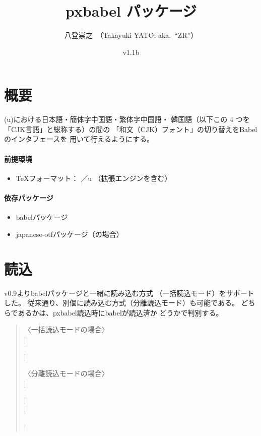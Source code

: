 \documentclass[a4paper,uplatex]{jsarticle}
\newcommand{\PkgVersion}{1.1b}
\newcommand{\PkgDate}{2017/07/03}
\newcommand{\Pkg}[1]{\textsf{#1}}
\newcommand{\Meta}[1]{$\langle$\mbox{}#1\mbox{}$\rangle$}
\providecommand{\upLaTeX}{u\pLaTeX}
\begin{document}
\title{\Pkg{pxbabel} パッケージ}
\author{八登崇之\ （Takayuki YATO; aka.~``ZR''）}
\date{v\PkgVersion \quad [\PkgDate]}
\maketitle

\section{概要}

{(u)\pLaTeX}における日本語・簡体字中国語・繁体字中国語・
韓国語（以下この 4 つを「CJK言語」と総称する）の間の
「和文（CJK）フォント」の切り替えをBabelのインタフェースを
用いて行えるようにする。

\paragraph{前提環境}

\begin{itemize}
\item {\TeX}フォーマット： {\pLaTeX}／{\upLaTeX}
  （拡張エンジンを含む）
\end{itemize}

\paragraph{依存パッケージ}

\begin{itemize}
\item \Pkg{babel}パッケージ
\item \Pkg{japanese-otf}パッケージ（{\pLaTeX}の場合）
\end{itemize}

\section{読込}

v0.9より\Pkg{babel}パッケージと一緒に読み込む方式
（一括読込モード）をサポートした。
従来通り、別個に読み込む方式（分離読込モード）も可能である。
どちらであるかは、\Pkg{pxbabel}読込時に\Pkg{babel}が読込済か
どうかで判別する。

\begin{quote}
〈一括読込モードの場合〉\\
|\usepackage[|\Meta{オプション}|]{pxbabel}|
\par\bigskip
〈分離読込モードの場合〉\\
|\usepackage[|\Meta{Babelのオプション}|]{babel}|\\
|\usepackage[|\Meta{オプション}|]{pxbabel}|
\end{quote}
\end{document}

